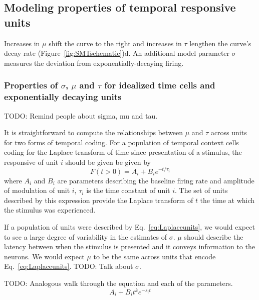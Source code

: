 \documentclass{apa}
\begin{document}
\subsection{Modeling properties of temporal responsive units}
Increases in
$\mu$ shift the curve to the right and increases in $\tau$ lengthen the
curve's decay rate (Figure~\ref{fig:SMTschematic})d. 
An additional model parameter $\sigma$ measures the deviation from exponentially-decaying
firing. 


\subsubsection{Properties of $\sigma$, $\mu$ and $\tau$ for idealized time cells
and exponentially decaying units}

TODO: Remind people about sigma, mu and tau.

It is straightforward to compute the relationships between $\mu$ and $\tau$
across units for two forms of temporal coding.  For a population of temporal
context cells coding for the Laplace transform of time since presentation of a
stimulus, the responsive of unit $i$ should be given be given by 
\begin{equation}
		F(t > 0) = A_i + B_i e^{- t/\tau_i}
		\label{eq:Laplaceunits}
\end{equation}
where $A_i$ and $B_i$ are parameters describing the baseline firing rate and
amplitude of modulation of unit $i$, $\tau_i$ is the time constant of unit
$i$.
The set of units described by this expression provide the Laplace transform of
$t$ the time at which the stimulus was experienced.

If a population of units were described by Eq.~\ref{eq:Laplaceunits}, we would
expect to see a large degree of variability in the estimates of $\sigma$.  
$\mu$ should describe the latency between when the stimulus is presented and
it conveys information to the neurons.  We would expect $\mu$ to be the same
across units that encode Eq.~\ref{eq:Laplaceunits}.
TODO: Talk about $\sigma$.

TODO: Analogous walk through the equation and each of the parameters.
\begin{equation}
		A_i + B_i  t^k e^{ -s_i t}
\end{equation}
\end{document}
